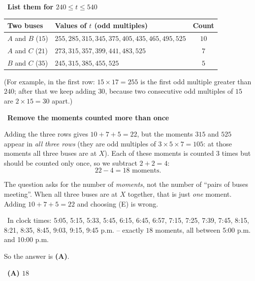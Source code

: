 \documentclass[11pt]{article}
\providecommand{\AnsWord}{Đáp số}
\newcommand{\ans}[1]{\par\smallskip{\bfseries\color{tmGreen!88!black}\AnsWord:}\ {\bfseries\color{AnsRed}#1}\par}
\newcommand{\step}[2]{\par\smallskip\noindent{\bfseries\color{tmBlue!85!black}\StepWord~#1.}\ {\bfseries #2}\par\nopagebreak}
\newcommand{\verify}[1]{\par\smallskip\noindent{\bfseries\color{tmGreen!80!black}\faCheckCircle\ \CheckWord}\ #1\par}
\def\AnsWord{Answer}
\def\StepWord{Step}
\def\CheckWord{Check:}
\begin{document}
{\step{5}{List them for $240\le t\le540$}
\begin{center}\begin{tabular}{|l|l|c|}\hline
Two buses & Values of $t$ (odd multiples) & Count\\\hline
$A$ and $B$ ($15$) & $255, 285, 315, 345, 375, 405, 435, 465, 495, 525$ & $10$\\\hline
$A$ and $C$ ($21$) & $273, 315, 357, 399, 441, 483, 525$ & $7$\\\hline
$B$ and $C$ ($35$) & $245, 315, 385, 455, 525$ & $5$\\\hline
\end{tabular}\end{center}
(For example, in the first row: $15\times17=255$ is the first odd multiple greater than $240$; after that we keep adding $30$, because
two consecutive odd multiples of $15$ are $2\times15=30$ apart.)

\step{6}{Remove the moments counted more than once}
Adding the three rows gives $10+7+5=22$, but the moments $315$ and $525$ appear in \emph{all three rows}
(they are odd multiples of $3\times5\times7=105$: at those moments all three buses are at $X$). Each of these moments is counted $3$ times
but should be counted only once, so we subtract $2+2=4$:
\[22-4=18 \text{ moments.}\]
\begin{warnbox}The question asks for the number of \emph{moments}, not the number of ``pairs of buses meeting''. When all three buses are at
$X$ together, that is just \emph{one} moment. Adding $10+7+5=22$ and choosing (E) is wrong.\end{warnbox}
\verify{In clock times: 5:05, 5:15, 5:33, 5:45, 6:15, 6:45, 6:57, 7:15, 7:25, 7:39, 7:45, 8:15, 8:21, 8:35, 8:45, 9:03, 9:15, 9:45 p.m.
-- exactly $18$ moments, all between 5:00 p.m. and 10:00 p.m.}
So the answer is \textbf{(A)}.
\ans{(A) $18$}
}
\end{document}
